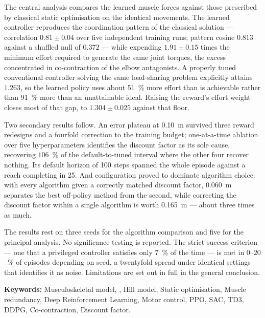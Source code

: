 The central analysis compares the learned muscle forces against those prescribed
by classical static optimisation on the identical movements. The learned
controller reproduces the coordination pattern of the classical solution ---
correlation $0.81 \pm 0.04$ over five independent training runs; pattern
cosine $0.813$ against a shuffled null of $0.372$ --- while expending
$1.91 \pm 0.15$ times the minimum effort required to generate the same joint
torques, the excess concentrated in co-contraction of the elbow antagonists. A
properly tuned conventional controller solving the same load-sharing problem
explicitly attains $1.263$, so the learned policy uses about 51~\% more effort
than is achievable rather than 91~\% more than an unattainable ideal. Raising the
reward's effort weight closes most of that gap, to $1.304 \pm 0.025$ against
that floor.

Two secondary results follow. An error plateau at \SI{0.10}{\meter} survived
three reward redesigns and a fourfold correction to the training budget;
one-at-a-time ablation over five hyperparameters identifies the discount factor
as its sole cause, recovering $106$~\% of the default-to-tuned interval where the
other four recover nothing. Its default horizon of 100 steps spanned the whole
episode against a reach completing in 25. And configuration proved to dominate algorithm choice: with every algorithm
given a correctly matched discount factor, \SI{0.060}{\meter} separates the best
off-policy method from the second, while correcting the discount factor within a
single algorithm is worth \SI{0.165}{\meter} --- about three times as much.

The results rest on three seeds for the algorithm comparison and five for the
principal analysis. No significance testing is reported. The strict success
criterion --- one that a privileged controller satisfies only $7$~\% of the time
--- is met in $0$--$20$~\% of episodes depending on seed, a twentyfold spread
under identical settings that identifies it as noise. Limitations are set out in
full in the general conclusion.

\bigskip
\noindent\textbf{Keywords:} Musculoskeletal model, \MuJoCo{}, Hill model, Static
optimisation, Muscle redundancy, Deep Reinforcement Learning, Motor control,
PPO, SAC, TD3, DDPG, Co-contraction, Discount factor.


